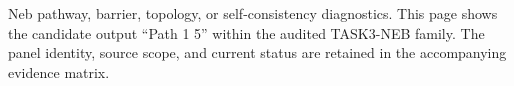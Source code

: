 Neb pathway, barrier, topology, or self-consistency diagnostics. This page shows the candidate output ``Path 1 5'' within the audited TASK3-NEB family. The panel identity, source scope, and current status are retained in the accompanying evidence matrix.
